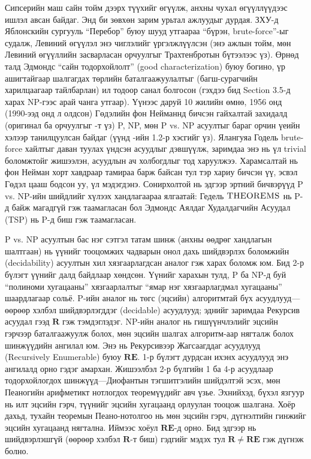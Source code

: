 Сипсерийн \cite{Sip92} маш сайн тойм дээрх түүхийг өгүүлж, анхны чухал өгүүллүүдээс ишлэл авсан байдаг. Энд би зөвхөн зарим урьтал ажлуудыг дурдая. ЗХУ-д Яблонскийн сургууль “Перебор” буюу шууд утгаараа “бүрэн, brute-force”-ыг судалж, Левиний өгүүлэл энэ чиглэлийг үргэлжлүүлсэн (энэ ажлын тойм, мөн Левиний өгүүллийн засварласан орчуулгыг Трахтенбротын \cite{Tra84} бүтээлээс үз). Өрнөд талд Эдмондс \cite{Edm66} “сайн тодорхойлолт” (good characterization) буюу богино, үр ашигтайгаар шалгагдах төрлийн баталгаажуулалтыг (багш-сурагчийн харилцаагаар тайлбарлан) ил тодоор санал болгосон (гэхдээ бид Section 3.5-д харах NP-гээс арай чанга утгаар). Үүнээс даруй 10 жилийн өмнө, 1956 онд (1990-ээд онд л олдсон) Гөдэлийн фон Нейманнд бичсэн гайхалтай захидалд (оригинал ба орчуулгыг \cite{Sip92}-т үз) P, NP, мөн P vs. NP асуултыг бараг орчин үеийн хэлээр танилцуулсан байдаг (үүнд \cite{Wig10b}-ийн 1.2-р хэсгийг үз). Ялангуяа Годель brute-force хайлтыг даван туулах үндсэн асуудлыг дэвшүүлж, заримдаа энэ нь үл trivial боломжтойг жишээлэн, асуудлын ач холбогдлыг тод харуулжээ. Харамсалтай нь фон Нейман хорт хавдраар тамираа барж байсан тул тэр хариу бичсэн үү, эсвэл Гөдэл цааш бодсон уу, үл мэдэгдэнэ. Сонирхолтой нь эдгээр эртний бичвэрүүд P vs. NP-ийн шийдлийг хүлээх хандлагаараа ялгаатай: Гедель $\textsc{THEOREMS}$ нь P-д байж магадгүй гэж таамагласан бол Эдмондс \cite{Edm67a} Аялдаг Худалдагчийн Асуудал (TSP) нь P-д биш гэж таамагласан.


P vs. NP асуултын бас нэг сэтгэл татам шинж (анхны өөдрөг хандлагын шалтгаан) нь үүнийг тооцомжих чадварын онол дахь шийдвэрлэх боломжийн (decidability) асуултын хил хязгаарлагдсан аналог гэж харах боломж юм. Бид 2-р бүлэгт үүнийг далд байдлаар хөндсөн. Үүнийг харахын тулд, P ба NP-д буй “полиноми хугацааны” хязгаарлалтыг “ямар нэг хязгаарлагдмал хугацааны” шаардлагаар сольё. P-ийн аналог нь төгс (эцсийн) алгоритмтай бүх асуудлууд—өөрөөр хэлбэл шийдвэрлэгддэг (decidable) асуудлууд; эднийг заримдаа Рекурсив асуудал гээд $\mathbf{R}$ гэж тэмдэглэдэг. NP-ийн аналог нь гишүүнчлэлийг эцсийн гэрчээр баталгаажуулж болох, мөн эцсийн шалгах алгоритм-аар нягталж болох шинжүүдийн ангилал юм. Энэ нь Рекурсивээр Жагсаагддаг асуудлууд (Recursively Enumerable) буюу $ \mathbf{RE}$. 1-р бүлэгт дурдсан ихэнх асуудлууд энэ ангилалд орно гэдэг амархан. Жишээлбэл 2-р бүлгийн 1 ба 4-р асуудлаар тодорхойлогдох шинжүүд—Диофантын тэгшитгэлийн шийдэлтэй эсэх, мөн Пеаногийн арифметикт нотлогдох теоремүүдийг авч үзье. Эхнийхэд, бүхэл язгуур нь илт эцсийн гэрч, түүнийг эцсийн хугацаанд орлуулан тооцож шалгана. Хоёр дахьд, тухайн теоремын Пеано-нотолгоо нь мөн эцсийн гэрч, дүгнэлтийн гинжийг эцсийн хугацаанд нягтална. Иймээс хоёул $\mathbf{RE}$-д орно. Бид эдгээр нь шийдвэрлэшгүй (өөрөөр хэлбэл $\mathbf{R}$-т биш) гэдгийг мэдэх тул $\mathbf{R} \ne \mathbf{RE}$ гэж дүгнэж болно.


